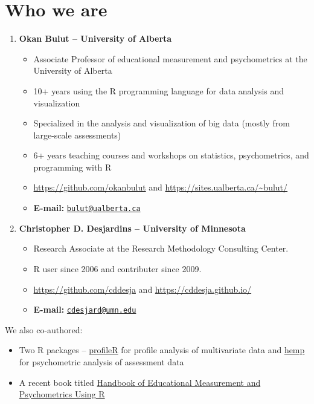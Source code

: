\documentclass[]{book}
\providecommand{\tightlist}{%
  \setlength{\itemsep}{0pt}\setlength{\parskip}{0pt}}
\begin{document}
\hypertarget{who-we-are}{%
\section{Who we are}\label{who-we-are}}

\begin{enumerate}
\def\labelenumi{\arabic{enumi}.}
\item
  \textbf{Okan Bulut -- University of Alberta}

  \begin{itemize}
  \tightlist
  \item
    Associate Professor of educational measurement and psychometrics at the University of Alberta
  \item
    10+ years using the R programming language for data analysis and visualization
  \item
    Specialized in the analysis and visualization of big data (mostly from large-scale assessments)
  \item
    6+ years teaching courses and workshops on statistics, psychometrics, and programming with R
  \item
    \url{https://github.com/okanbulut} and \url{https://sites.ualberta.ca/~bulut/}
  \item
    \textbf{E-mail:} \href{mailto:bulut@ualberta.ca}{\nolinkurl{bulut@ualberta.ca}}
  \end{itemize}
\item
  \textbf{Christopher D. Desjardins -- University of Minnesota}

  \begin{itemize}
  \tightlist
  \item
    Research Associate at the Research Methodology Consulting Center.
  \item
    R user since 2006 and contributer since 2009.
  \item
    \url{https://github.com/cddesja} and \url{https://cddesja.github.io/}
  \item
    \textbf{E-mail:} \href{mailto:cdesjard@umn.edu}{\nolinkurl{cdesjard@umn.edu}}
  \end{itemize}
\end{enumerate}

We also co-authored:

\begin{itemize}
\tightlist
\item
  Two R packages -- \href{https://cran.r-project.org/web/packages/profileR/index.html}{profileR} for profile analysis of multivariate data and \href{https://github.com/cddesja/hemp}{hemp} for psychometric analysis of assessment data
\item
  A recent book titled \href{https://www.crcpress.com/Handbook-of-Educational-Measurement-and-Psychometrics-Using-R/Desjardins-Bulut/p/book/9781498770132}{Handbook of Educational Measurement and Psychometrics Using R}
\end{itemize}
\end{document}
